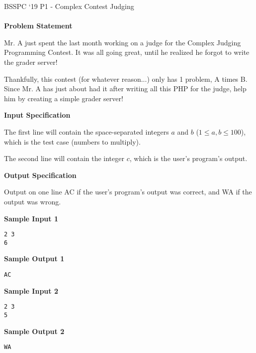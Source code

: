 \documentclass[]{article}
\begin{document}
{\Large BSSPC ‘19 P1 - Complex Contest Judging}
\\\\
\textbf{\large Problem Statement}
\par
Mr. A just spent the last month working on a judge for the Complex Judging Programming Contest. It was all going great, until he realized he forgot to write the grader server!

\par
Thankfully, this contest (for whatever reason...) only has 1 problem, A times B. Since Mr. A has just about had it after writing all this PHP for the judge, help him by creating a simple grader server!

\textbf{\large Input Specification}
\par
The first line will contain the space-separated integers $a$ and $b$ ($1 \le a, b \le 100$), which is the test case (numbers to multiply).

The second line will contain the integer $c$, which is the user’s program’s output.

\textbf{\large Output Specification}
\par
Output on one line AC if the user’s program’s output was correct, and WA if the output was wrong.

\textbf{\large Sample Input 1}
\vspace{-\topsep}
\begin{verbatim}
2 3
6
\end{verbatim}
\textbf{\large Sample Output 1}
\begin{verbatim}
AC
\end{verbatim}
\textbf{\large Sample Input 2}
\begin{verbatim}
2 3
5
\end{verbatim}
\textbf{\large Sample Output 2}
\begin{verbatim}
WA
\end{verbatim}
\end{document}
